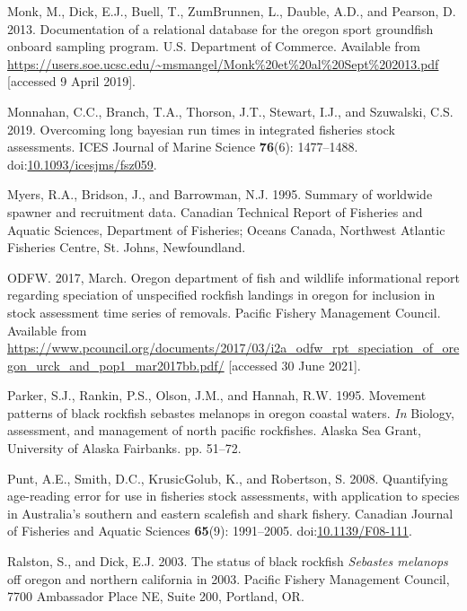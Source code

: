 \documentclass[11pt,
  english,
  letterpaper,
]{article}
\newlength{\cslhangindent}
\newenvironment{CSLReferences}[2] %
 {%
  \setlength{\parindent}{0pt}
  \ifodd #1 \everypar{\setlength{\hangindent}{\cslhangindent}}\ignorespaces\fi
  \ifnum #2 > 0
  \setlength{\parskip}{#2\baselineskip}
  \fi
 }%
 {}
\begin{document}
\begin{CSLReferences}{1}{0}
\leavevmode{}%
Monk, M., Dick, E.J., Buell, T., ZumBrunnen, L., Dauble, A.D., and Pearson, D. 2013. Documentation of a relational database for the oregon sport groundfish onboard sampling program. U.S. Department of Commerce. Available from \url{https://users.soe.ucsc.edu/~msmangel/Monk\%20et\%20al\%20Sept\%202013.pdf} {[}accessed 9 April 2019{]}.

\leavevmode{}%
Monnahan, C.C., Branch, T.A., Thorson, J.T., Stewart, I.J., and Szuwalski, C.S. 2019. Overcoming long bayesian run times in integrated fisheries stock assessments. {ICES} Journal of Marine Science \textbf{76}(6): 1477--1488. doi:\href{https://doi.org/10.1093/icesjms/fsz059}{10.1093/icesjms/fsz059}.

\leavevmode{}%
Myers, R.A., Bridson, J., and Barrowman, N.J. 1995. Summary of worldwide spawner and recruitment data. Canadian Technical Report of Fisheries and Aquatic Sciences, Department of Fisheries; Oceans Canada, Northwest Atlantic Fisheries Centre, St. Johns, Newfoundland.

\leavevmode{}%
ODFW. 2017, March. Oregon department of fish and wildlife informational report regarding speciation of unspecified rockfish landings in oregon for inclusion in stock assessment time series of removals. Pacific Fishery Management Council. Available from \url{https://www.pcouncil.org/documents/2017/03/i2a_odfw_rpt_speciation_of_oregon_urck_and_pop1_mar2017bb.pdf/} {[}accessed 30 June 2021{]}.

\leavevmode{}%
Parker, S.J., Rankin, P.S., Olson, J.M., and Hannah, R.W. 1995. Movement patterns of black rockfish sebastes melanops in oregon coastal waters. \emph{In} Biology, assessment, and management of north pacific rockfishes. Alaska Sea Grant, University of Alaska Fairbanks. pp. 51--72.

\leavevmode{}%
Punt, A.E., Smith, D.C., KrusicGolub, K., and Robertson, S. 2008. Quantifying age-reading error for use in fisheries stock assessments, with application to species in {A}ustralia's southern and eastern scalefish and shark fishery. Canadian Journal of Fisheries and Aquatic Sciences \textbf{65}(9): 1991--2005. doi:\href{https://doi.org/10.1139/F08-111}{10.1139/F08-111}.

\leavevmode{}%
Ralston, S., and Dick, E.J. 2003. The status of black rockfish \emph{{Sebastes} melanops} off oregon and northern california in 2003. Pacific Fishery Management Council, 7700 Ambassador Place NE, Suite 200, Portland, OR.


\end{CSLReferences}
\end{document}
